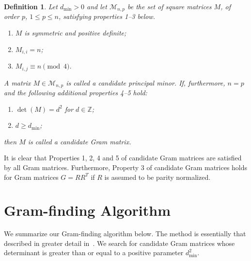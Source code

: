 \documentclass[11pt,a4paper]{article}
\newtheorem{definition}{Definition}
\newcommand{\integer}{\mathbb{Z}}
\begin{document}
\begin{samepage}
\begin{definition} \label{def:candGram} 
Let $d_{\text{min}} > 0$ and let $\mathcal{M}_{n, p}$ be the set
of square matrices $M$, of order $p$, 
$1 \le p \le n$,	%
satisfying properties 1--3 below.

\begin{enumerate}
\item  $M$ is symmetric and positive definite;
\item $M_{i,i}=n$;
\item \label{it:n_mod4} $M_{i,j} \equiv n \pmod 4$.
\end{enumerate}

A matrix $M \in \mathcal{M}_{n,p}$ is called a \emph{candidate principal
minor}.  If, furthermore, $n=p$ and the following additional properties 4--5
hold:

\begin{enumerate}
\item[4.]  $\det(M) = d^2$ for $d \in \integer$;
\item[5.]  $d \ge d_{\text{min}}$;
\end{enumerate}
then $M$ is called a \emph{candidate Gram matrix}.
\end{definition}
\end{samepage}

It is clear that Properties 1, 2, 4 and 5 of candidate Gram matrices are
satisfied by all Gram matrices.  Furthermore, Property 3 of candidate Gram
matrices holds for Gram matrices $G = RR^T$ 
if $R$ is assumed to be parity normalized.

\newpage
\section{Gram-finding Algorithm} \label{sec:gram-finding}
 
We summarize our Gram-finding algorithm below.  The method is essentially
that described in greater detail in~\cite{Orrick05}.
We search for candidate Gram matrices whose
determinant is greater than or equal to a positive parameter $d_{\min}^2$.
\end{document}
